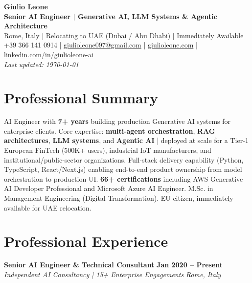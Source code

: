 \documentclass[11pt, letterpaper]{article}
\begin{document}
\begin{center}
    {\Huge \textbf{Giulio Leone}} \\ \vspace{4pt}
    {\Large \textbf{Senior AI Engineer | Generative AI, LLM Systems \& Agentic Architecture}} \\ \vspace{8pt}
    Rome, Italy | Relocating to UAE (Dubai / Abu Dhabi) | Immediately Available \\ \vspace{4pt}
    +39 366 141 0914 | \href{mailto:giulioleone097@gmail.com}{giulioleone097@gmail.com} | \href{https://giulioleone.com}{giulioleone.com} | \href{https://www.linkedin.com/in/giulioleone-ai/}{linkedin.com/in/giulioleone-ai} \\ \vspace{2pt} \textit{Last updated: \today}
\end{center}

\vspace{1em}

\section*{Professional Summary}
AI Engineer with \textbf{7+ years} building production Generative AI systems for enterprise clients. Core expertise: \textbf{multi-agent orchestration}, \textbf{RAG architectures}, \textbf{LLM systems}, and \textbf{Agentic AI} | deployed at scale for a Tier-1 European FinTech (500K+ users), industrial IoT manufacturers, and institutional/public-sector organizations. Full-stack delivery capability (Python, TypeScript, React/Next.js) enabling end-to-end product ownership from model orchestration to production UI. \textbf{66+ certifications} including AWS Generative AI Developer Professional and Microsoft Azure AI Engineer. M.Sc. in Management Engineering (Digital Transformation). EU citizen, immediately available for UAE relocation.

\section*{Professional Experience}

\noindent \textbf{Senior AI Engineer \& Technical Consultant} \hfill \textbf{Jan 2020 -- Present} \\
\textit{Independent AI Consultancy | 15+ Enterprise Engagements} \hfill \textit{Rome, Italy}
\vspace{4pt}
\end{document}
